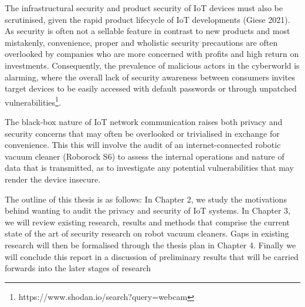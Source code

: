 \documentclass[]{resources/unswthesis}
\begin{document}
The infrastructural security and product security of IoT devices must
also be scrutinised, given the rapid product lifecycle of IoT
developments (Giese 2021). As security is often not a sellable feature
in contrast to new products and most mistakenly, convenience, proper and
wholistic security precautions are often overlooked by companies who are
more concerned with profits and high return on investments.
Consequently, the prevalence of malicious actors in the cyberworld is
alarming, where the overall lack of security awareness between consumers
invites target devices to be easily accessed with default passwords or
through unpatched vulnerabilities\footnote{https://www.shodan.io/search?query=webcam}.

The black-box nature of IoT network communication raises both privacy
and security concerns that may often be overlooked or trivialised in
exchange for convenience. This this will involve the audit of an
internet-connected robotic vacuum cleaner (Roborock S6) to assess the
internal operations and nature of data that is transmitted, as to
investigate any potential vulnerabilities that may render the device
insecure.

The outline of this thesis is as follows: In Chapter 2, we study the
motivations behind wanting to audit the privacy and security of IoT
systems. In Chapter 3, we will review existing research, results and
methods that comprise the current state of the art of security research
on robot vacuum cleaners. Gaps in existing research will then be
formalised through the thesis plan in Chapter 4. Finally we will
conclude this report in a discussion of preliminary results that will be
carried forwards into the later stages of research
\end{document}
